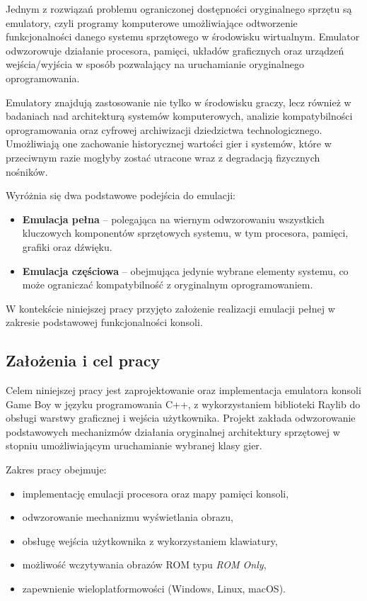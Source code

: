 \documentclass{article}
\begin{document}
Jednym z rozwiązań problemu ograniczonej dostępności oryginalnego sprzętu są emulatory, czyli programy komputerowe umożliwiające odtworzenie funkcjonalności danego systemu sprzętowego w środowisku wirtualnym. Emulator odwzorowuje działanie procesora, pamięci, układów graficznych oraz urządzeń wejścia/wyjścia w sposób pozwalający na uruchamianie oryginalnego oprogramowania.

Emulatory znajdują zastosowanie nie tylko w środowisku graczy, lecz również w badaniach nad architekturą systemów komputerowych, analizie kompatybilności oprogramowania oraz cyfrowej archiwizacji dziedzictwa technologicznego. Umożliwiają one zachowanie historycznej wartości gier i systemów, które w przeciwnym razie mogłyby zostać utracone wraz z degradacją fizycznych nośników.

Wyróżnia się dwa podstawowe podejścia do emulacji:
\begin{itemize}
	\item \textbf{Emulacja pełna} – polegająca na wiernym odwzorowaniu wszystkich kluczowych komponentów sprzętowych systemu, w tym procesora, pamięci, grafiki oraz dźwięku.
	\item \textbf{Emulacja częściowa} – obejmująca jedynie wybrane elementy systemu, co może ograniczać kompatybilność z oryginalnym oprogramowaniem.
\end{itemize}

W kontekście niniejszej pracy przyjęto założenie realizacji emulacji pełnej w zakresie podstawowej funkcjonalności konsoli.

\subsection{Założenia i cel pracy}

Celem niniejszej pracy jest zaprojektowanie oraz implementacja emulatora konsoli Game Boy w języku programowania C++, z wykorzystaniem biblioteki Raylib do obsługi warstwy graficznej i wejścia użytkownika. Projekt zakłada odwzorowanie podstawowych mechanizmów działania oryginalnej architektury sprzętowej w stopniu umożliwiającym uruchamianie wybranej klasy gier.

Zakres pracy obejmuje:
\begin{itemize}
	\item implementację emulacji procesora oraz mapy pamięci konsoli,
	\item odwzorowanie mechanizmu wyświetlania obrazu,
	\item obsługę wejścia użytkownika z wykorzystaniem klawiatury,
	\item możliwość wczytywania obrazów ROM typu \textit{ROM Only},
	\item zapewnienie wieloplatformowości (Windows, Linux, macOS).
\end{itemize}
\end{document}
